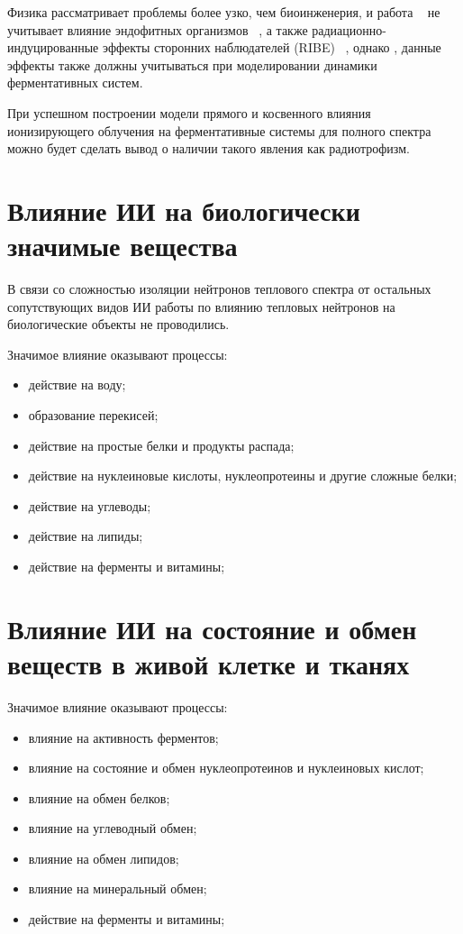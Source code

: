 \documentclass[11pt]{article}
\begin{document}
Физика рассматривает проблемы более узко, чем биоинженерия, и работа ~\cite{Gudkov} не учитывает влияние эндофитных организмов ~\cite{vasileva}, а также радиационно-индуцированные эффекты сторонних наблюдателей (RIBE) ~\cite{ribe}, однако
, данные эффекты также должны учитываться при моделировании динамики ферментативных систем.

При успешном построении модели прямого и косвенного влияния ионизирующего облучения на ферментативные системы для полного спектра можно будет сделать вывод о наличии такого явления как радиотрофизм.


\section{Влияние ИИ на биологически значимые вещества}
В связи со сложностью изоляции нейтронов теплового спектра от остальных сопутствующих видов ИИ работы по влиянию тепловых нейтронов на биологические объекты не проводились. 

Значимое влияние оказывают процессы:
\begin{itemize} 
\item действие на воду; 
\item образование перекисей; 
\item действие на простые белки и продукты распада;
\item действие на нуклеиновые кислоты, нуклеопротеины и другие сложные белки;
\item действие на углеводы;
\item действие на липиды;
\item действие на ферменты и витамины;
\end{itemize} 


\section{Влияние ИИ на состояние и обмен веществ в живой клетке и тканях}
Значимое влияние оказывают процессы:
\begin{itemize} 
\item влияние на активность ферментов; 
\item влияние на состояние и обмен нуклеопротеинов и нуклеиновых кислот; 
\item влияние на обмен белков;
\item влияние на углеводный обмен;
\item влияние на обмен липидов;
\item влияние на минеральный обмен;
\item действие на ферменты и витамины;
\end{itemize} 
\end{document}
